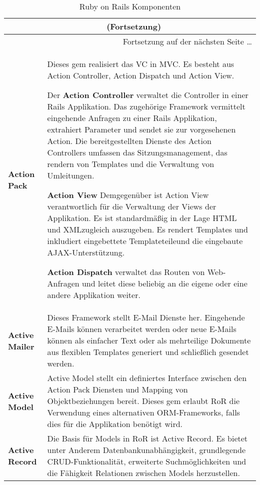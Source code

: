 \begin{longtable}{|p{1.8cm}|p{12.5cm}|}
\caption{Ruby on Rails Komponenten\footnotemark}\label{ref:tabRoRComp}\\\hline

\endfirsthead

\multicolumn{2}{c}{\tablename\ \thetable{} (Fortsetzung)} \\\hline
\endhead

\hline \multicolumn{2}{|r|}{{Fortsetzung auf der nächsten Seite \ldots}}\\\hline
\endfoot

\hline
\endlastfoot

\textbf{Action Pack}&Dieses gem realisiert das VC in MVC. Es besteht aus Action
Controller, Action Dispatch und Action View.

Der \textbf{Action Controller} verwaltet die Controller in einer Rails
Applikation.
Das zugehörige Framework vermittelt eingehende Anfragen zu einer Rails
Applikation, extrahiert Parameter und sendet sie zur vorgesehenen Action. Die
bereitgestellten Dienste des Action Controllers umfassen das Sitzungsmanagement,
das rendern von Templates und die Verwaltung von Umleitungen.

\textbf{Action View} Demgegenüber ist Action View verantwortlich für die
Verwaltung der Views der Applikation. Es ist standardmäßig in der Lage HTML und
XML\footnotemark zugleich auszugeben. Es rendert Templates und inkludiert
eingebettete Templateteile\footnotemark und die eingebaute
AJAX\footnotemark-Unterstützung.

\textbf{Action Dispatch} verwaltet das Routen von Web-Anfragen und leitet diese
beliebig an die eigene oder eine andere Applikation weiter. \\\hline

\textbf{Active Mailer}& Dieses Framework stellt E-Mail Dienste her.
Eingehende E-Mails können verarbeitet werden oder neue E-Mails können
als einfacher Text oder als mehrteilige Dokumente aus flexiblen
Templates generiert und schließlich gesendet werden.\\\hline

\textbf{Active Model}&Active Model stellt ein definiertes Interface
zwischen den Action Pack Diensten und Mapping von Objektbeziehungen
bereit. Dieses gem erlaubt RoR die Verwendung eines alternativen
ORM\footnotemark-Frameworks, falls dies für die Applikation benötigt
wird.\\\hline

\textbf{Active Record}&Die Basis für Models in RoR ist Active Record. Es bietet
unter Anderem Datenbankunabhängigkeit, grundlegende
CRUD\footnotemark-Funktionalität, erweiterte Suchmöglichkeiten und die Fähigkeit
Relationen zwischen Models herzustellen.
\\\hline


\end{longtable}
